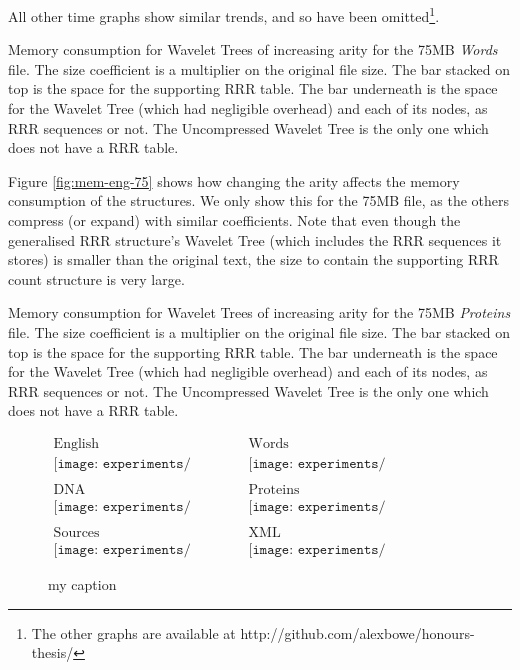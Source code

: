 All other time graphs show similar trends, and so have been omitted\footnote{The 
other graphs are available at http://github.com/alexbowe/honours-thesis/}.

			{Memory consumption for Wavelet Trees of increasing arity for
			the 75MB \emph{Words} file. The size coefficient is a multiplier
			on the original file size. The bar stacked on top is the space for
			the supporting RRR table. The bar underneath is the space for
			the Wavelet Tree (which had negligible overhead) and each of its
			nodes, as RRR sequences or not. The Uncompressed Wavelet Tree is
			the only one which does not have a RRR table.}

Figure \ref{fig:mem-eng-75} shows how changing the arity affects the memory
consumption of the structures. We only show this for the 75MB file, as the 
others compress (or expand) with similar coefficients. Note that even though 
the generalised RRR structure's Wavelet Tree (which includes the RRR sequences 
it stores) is smaller than the original text, the size to contain the supporting 
RRR count structure is very large.

			{Memory consumption for Wavelet Trees of increasing arity for
			the 75MB \emph{Proteins} file. The size coefficient is a multiplier
			on the original file size. The bar stacked on top is the space for
			the supporting RRR table. The bar underneath is the space for
			the Wavelet Tree (which had negligible overhead) and each of its
			nodes, as RRR sequences or not. The Uncompressed Wavelet Tree is
			the only one which does not have a RRR table.}
		
	
\begin{figure}[h]
\begin{center}$
\begin{array}{cc}
\mbox{English} & \mbox{Words} \\
\texttt{[image: experiments/sparse\_english]} &
\texttt{[image: experiments/sparse\_english\_ints]} \\ \\
\mbox{DNA} & \mbox{Proteins} \\ 
\texttt{[image: experiments/sparse\_dna]} &
\texttt{[image: experiments/sparse\_proteins]} \\ \\
\mbox{Sources} & \mbox{XML} \\
\texttt{[image: experiments/sparse\_sources]} &
\texttt{[image: experiments/sparse\_dblp\_xml]}
\end{array}$
\end{center}
\caption{my caption}
\label{fig:sparse}
\end{figure}

